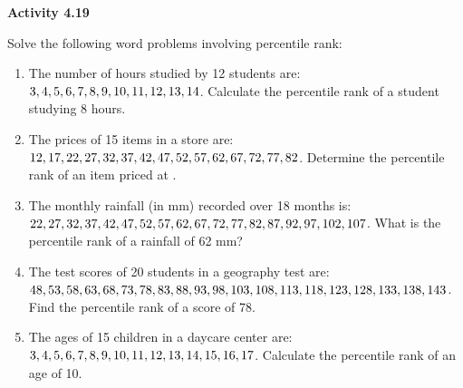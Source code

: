 \vspace{0.3ex}
\noindent\textbf{Activity 4.19}

\vspace{0.2ex}

Solve the following word problems involving percentile rank:  

\begin{enumerate}
    \item The number of hours studied by 12 students are: \(3, 4, 5, 6, 7, 8, 9, 10, 11,\\ 12, 13, 14\). Calculate the percentile rank of a student studying 8 hours.  
    \item The prices of 15 items in a store are: \(12, 17, 22, 27, 32, 37, 42, 47, 52, 57,\\ 62, 67, 72, 77, 82\). Determine the percentile rank of an item priced at .  
    \item The monthly rainfall (in mm) recorded over 18 months is: \(22, 27, 32, 37,\\ 42, 47, 52, 57, 62, 67, 72, 77, 82, 87, 92, 97, 102, 107\). What is the percentile rank of a rainfall of 62 mm?  
    \item The test scores of 20 students in a geography test are: \(48, 53, 58, 63, 68, 73,\\ 78, 83, 88, 93, 98, 103, 108, 113, 118, 123, 128, 133, 138, 143\). Find the percentile rank of a score of 78.  
    \item The ages of 15 children in a daycare center are: \(3, 4, 5, 6, 7, 8, 9, 10, 11, 12,\\ 13, 14, 15, 16, 17\). Calculate the percentile rank of an age of 10.  
\end{enumerate}
